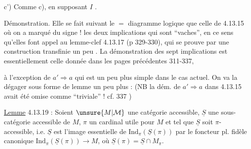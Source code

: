 c')  Comme c),  en supposant $I$ .



Démonstration. Elle se fait suivant le $=$ diagramme logique que celle de 4.13.15
où on a marqué du signe ! les deux implications qui sont ``vaches'', en ce sens qu'elles font appel au lemme-clef 4.13.17 (p 329-330), qui se prouve par une construction transfinie un peu . La démonstration  des sept implications  est essentiellement celle donnée dans les pages précédentes 311-337,



à l'exception de $a'\Rightarrow a$ qui est un peu plus simple dans le cas actuel. On va la dégager sous forme de lemme un peu plus  : (NB la dém. de $a'\Rightarrow a$ dans 4.13.15 avait été omise comme ``triviale'' ! cf.  337 \unsure{\ldots})

\uline{Lemme} 4.13.19 : Soient $\unsure{M|\mathcal M}$ une catégorie accessible, $\underline S$ une sous-catégorie accessible de $M$, $\pi$ un cardinal utile pour $M$ et tel que $\underline S$ soit $\pi$-accessible, i.e. $\underline S$ est l'image essentielle de $\mathrm{Ind}_\pi(\underline S(\pi))$ par le foncteur pl. fidèle canonique $\mathrm{Ind}_\pi(\underline S(\pi))\longrightarrow M$, où $\underline S(\pi)=\underline S\cap M_\pi$.

